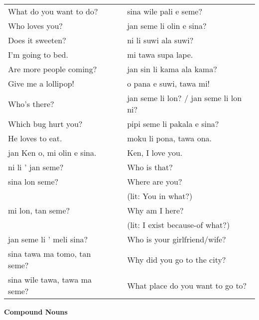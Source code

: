 \begin{supertabular}{p{5,5cm}|ll}
What do you want to do?  && sina wile pali e seme? \\ %
Who loves you?  && jan seme li olin e sina? \\ %
Does it sweeten? && ni li suwi ala suwi? \\ %
I'm going to bed.  && mi tawa supa lape. \\ %
Are more people coming?  && jan sin li kama ala kama? \\ %
Give me a lollipop!  && o pana e suwi, tawa mi! \\ %
Who's there?  && jan seme li lon? / jan seme li lon ni? \\ %
Which bug hurt you?  && pipi seme li pakala e sina? \\ %
He loves to eat.  && moku li pona, tawa ona. \\ %
jan Ken o, mi olin e sina.  && Ken, I love you. \\
ni li ' jan seme?  && Who is that? \\
sina lon seme?  && Where are you? \\ 
                &&   (lit: You in what?) \\ %
mi lon, tan seme?  && Why am I here? \\ 
                &&   (lit: I exist because-of what?) \\ %
jan seme li ' meli sina?  && Who is your girlfriend/wife? \\
sina tawa ma tomo, tan seme?  && Why did you go to the city? \\
sina wile tawa, tawa ma seme?  && What place do you want to go to? \\
\end{supertabular} 

\textbf{Compound Nouns} 
\label{'pi'}

